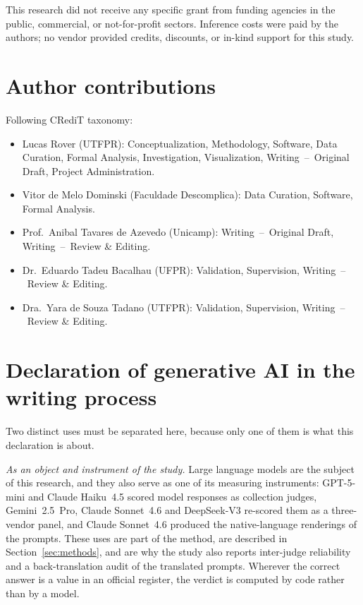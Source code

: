 \documentclass[review,authoryear,12pt]{elsarticle}
\begin{document}
This research did not receive any specific grant from funding agencies in the
public, commercial, or not-for-profit sectors. Inference costs were paid by the
authors; no vendor provided credits, discounts, or in-kind support for this
study.

\section*{Author contributions}

Following CRediT taxonomy:
\begin{itemize}\setlength{\itemsep}{0pt}
\item Lucas Rover (UTFPR): Conceptualization, Methodology, Software,
  Data Curation, Formal Analysis, Investigation, Visualization,
  Writing~--~Original Draft, Project Administration.
\item Vitor de Melo Dominski (Faculdade Descomplica): Data Curation,
  Software, Formal Analysis.
\item Prof.\ Anibal Tavares de Azevedo (Unicamp):
  Writing~--~Original Draft, Writing~--~Review \& Editing.
\item Dr.\ Eduardo Tadeu Bacalhau (UFPR): Validation, Supervision,
  Writing~--~Review \& Editing.
\item Dra.\ Yara de Souza Tadano (UTFPR): Validation, Supervision,
  Writing~--~Review \& Editing.
\end{itemize}

\section*{Declaration of generative AI in the writing process}

Two distinct uses must be separated here, because only one of them is what this
declaration is about.

\emph{As an object and instrument of the study.} Large language models are the
subject of this research, and they also serve as one of its measuring
instruments: GPT-5-mini and Claude Haiku~4.5 scored model responses as
collection judges, Gemini~2.5~Pro, Claude Sonnet~4.6 and DeepSeek-V3 re-scored
them as a three-vendor panel, and Claude Sonnet~4.6 produced the native-language
renderings of the prompts. These uses are part of the method,
are described in Section~\ref{sec:methods}, and are why the study also reports
inter-judge reliability and a back-translation audit of the translated prompts.
Wherever the correct answer is a value in an official register, the verdict is
computed by code rather than by a model.
\end{document}
